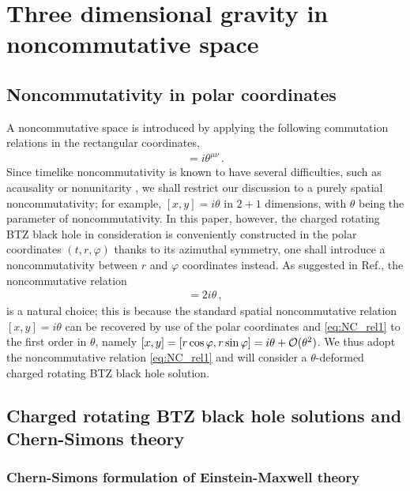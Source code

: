 \documentclass[11pt]{article}
\newcommand{\vap}{\varphi}
\numberwithin{equation}{section}
\begin{document}
\section{Three dimensional gravity in noncommutative space}
\label{sec:NC_gravity}

\subsection{Noncommutativity in polar coordinates}
\label{sec:nonc-with-polar}

A noncommutative space is introduced by applying the following commutation
relations in the rectangular coordinates,
\begin{align}
  [x^\mu, x^\nu] = i \theta^{\mu\nu} \,.
\end{align}
Since timelike noncommutativity is known to have several difficulties,
such as acausality or nonunitarity \cite{timelikeNC},
we shall restrict our discussion to a purely spatial
noncommutativity; for example, $[x,y]=i\theta$ in $2+1$ dimensions, with $\theta$ being the parameter of
noncommutativity.
In this paper, however, the charged rotating BTZ black hole
in consideration is conveniently constructed in the polar coordinates
$(t,r,\vap)$ thanks to its azimuthal symmetry, one shall introduce a noncommutativity between
$r$ and $\vap$ coordinates instead.  As suggested in Ref.\cite{ChangYoung:2008my},  the noncommutative relation
\begin{align}
  [r^2, \vap]=2i\theta \,,
\label{eq:NC_rel1}
\end{align}
is a natural choice;
this is because the standard spatial noncommutative relation $[x,y]=i\theta$ can be recovered 
by use of the polar coordinates and \eqref{eq:NC_rel1} to the first
order in $\theta$, namely 
$[x,y]=[r \cos\vap, r \sin\vap]=i\theta + {\cal O}(\theta^2)$.
We thus adopt the noncommutative relation \eqref{eq:NC_rel1} and will consider a
$\theta$-deformed
charged rotating BTZ black hole solution.



\subsection{Charged rotating BTZ black hole solutions and Chern-Simons theory}
\label{sec:charged-rotating-btz}

\subsubsection{Chern-Simons formulation of Einstein-Maxwell theory}
\label{sec:chern-simons-form}
\end{document}
